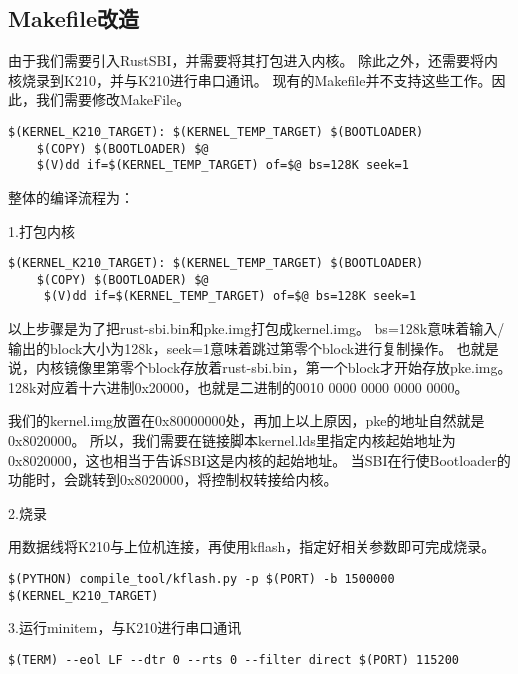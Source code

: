 \subsection{Makefile改造}

由于我们需要引入RustSBI，并需要将其打包进入内核。
除此之外，还需要将内核烧录到K210，并与K210进行串口通讯。
现有的Makefile并不支持这些工作。因此，我们需要修改MakeFile。

\begin{lstlisting}[caption={修改Makefile}, label={lst:change_makefile}]
    $(KERNEL_K210_TARGET): $(KERNEL_TEMP_TARGET) $(BOOTLOADER)
    $(COPY) $(BOOTLOADER) $@
    $(V)dd if=$(KERNEL_TEMP_TARGET) of=$@ bs=128K seek=1
\end{lstlisting}

整体的编译流程为：

1.打包内核

\begin{lstlisting}[caption={打包内核}, label={lst:pack_kernel}]
    $(KERNEL_K210_TARGET): $(KERNEL_TEMP_TARGET) $(BOOTLOADER)
    $(COPY) $(BOOTLOADER) $@
     $(V)dd if=$(KERNEL_TEMP_TARGET) of=$@ bs=128K seek=1
\end{lstlisting}


以上步骤是为了把rust-sbi.bin和pke.img打包成kernel.img。
bs=128k意味着输入/输出的block大小为128k，seek=1意味着跳过第零个block进行复制操作。
也就是说，内核镜像里第零个block存放着rust-sbi.bin，第一个block才开始存放pke.img。
128k对应着十六进制0x20000，也就是二进制的0010 0000 0000 0000 0000。

我们的kernel.img放置在0x80000000处，再加上以上原因，pke的地址自然就是0x8020000。
所以，我们需要在链接脚本kernel.lds里指定内核起始地址为0x8020000，这也相当于告诉SBI这是内核的起始地址。
当SBI在行使Bootloader的功能时，会跳转到0x8020000，将控制权转接给内核。

2.烧录

用数据线将K210与上位机连接，再使用kflash，指定好相关参数即可完成烧录。

\begin{lstlisting}[caption={烧录}, label={lst:burn}]
    $(PYTHON) compile_tool/kflash.py -p $(PORT) -b 1500000 $(KERNEL_K210_TARGET)
\end{lstlisting}

3.运行minitem，与K210进行串口通讯

\begin{lstlisting}[caption={运行minitem}, label={lst:run_minitem}]
    $(TERM) --eol LF --dtr 0 --rts 0 --filter direct $(PORT) 115200
\end{lstlisting}

